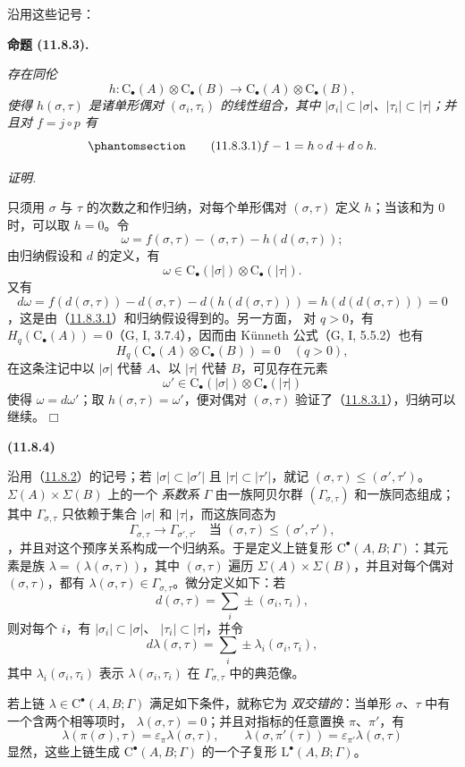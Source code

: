 \documentclass[UTF8,fontset=none,11pt,oneside,openany]{ctexbook}
\providecommand{\square}{\mdlgwhtsquare}
\newenvironment{env}[1][]{%
  \par\medskip\noindent\textbf{(#1)}\ %
}{\par}
\newenvironment{proposition}[1][]{%
  \par\medskip\noindent\textbf{命题 (#1).}\ %
}{\par}
\newenvironment{proof}{%
  \par\smallskip\noindent\textit{证明.}\ %
}{\hfill$\square$\par}
\newcommand{\oldpage}[2][]{%
  \hypertarget{ega-source-page-#1-#2}{}%
  \marginnote{\scriptsize\textbf{#1}~|~#2}\ignorespaces}
\let\EGAOriginalLabel\label
\renewcommand{\label}[1]{\phantomsection\EGAOriginalLabel{#1}}
\begin{document}
\oldpage[0\textsubscript{III}]{44}
沿用这些记号：
\begin{proposition}[11.8.3]
\label{0.11.8.3-fr}
\emph{存在同伦
\[
h:\mathrm C_\bullet(A)\otimes\mathrm C_\bullet(B)
\longrightarrow\mathrm C_\bullet(A)\otimes\mathrm C_\bullet(B),
\]
使得 $h(\sigma,\tau)$ 是诸单形偶对 $(\sigma_i,\tau_i)$ 的线性组合，其中
$|\sigma_i|\subset|\sigma|$、$|\tau_i|\subset|\tau|$；并且对
$f=j\circ p$ 有}
\[
\label{0.11.8.3.1-fr}
\tag{11.8.3.1}
f-1=h\circ d+d\circ h.
\]
\end{proposition}

\begin{proof}
只须用 $\sigma$ 与 $\tau$ 的次数之和作归纳，对每个单形偶对
$(\sigma,\tau)$ 定义 $h$；当该和为 $0$ 时，可以取 $h=0$。令
\[
\omega=f(\sigma,\tau)-(\sigma,\tau)-h(d(\sigma,\tau));
\]
由归纳假设和 $d$ 的定义，有
\[
\omega\in\mathrm C_\bullet(|\sigma|)\otimes\mathrm C_\bullet(|\tau|).
\]
又有
\[
d\omega=f(d(\sigma,\tau))-d(\sigma,\tau)-d(h(d(\sigma,\tau)))
=h(d(d(\sigma,\tau)))=0
\]
，这是由（\hyperref[0.11.8.3.1-fr]{11.8.3.1}）和归纳假设得到的。另一方面，
对 $q>0$，有 $H_q(\mathrm C_\bullet(A))=0$（G, I, 3.7.4），因而由 Künneth
公式（G, I, 5.5.2）也有
\[
H_q(\mathrm C_\bullet(A)\otimes\mathrm C_\bullet(B))=0\quad(q>0),
\]
在这条注记中以 $|\sigma|$ 代替 $A$、以 $|\tau|$ 代替 $B$，可见存在元素
\[
\omega'\in\mathrm C_\bullet(|\sigma|)\otimes\mathrm C_\bullet(|\tau|)
\]
使得 $\omega=d\omega'$；取 $h(\sigma,\tau)=\omega'$，便对偶对
$(\sigma,\tau)$ 验证了（\hyperref[0.11.8.3.1-fr]{11.8.3.1}），归纳可以继续。
\end{proof}

\begin{env}[11.8.4]
\label{0.11.8.4-fr}
沿用（\hyperref[0.11.8.2-fr]{11.8.2}）的记号；若
$|\sigma|\subset|\sigma'|$ 且 $|\tau|\subset|\tau'|$，就记
$(\sigma,\tau)\leq(\sigma',\tau')$。$\Sigma(A)\times\Sigma(B)$ 上的一个
\emph{系数系} $\Gamma$ 由一族阿贝尔群 $(\Gamma_{\sigma,\tau})$ 和一族同态组成；其中
$\Gamma_{\sigma,\tau}$ 只依赖于集合 $|\sigma|$ 和 $|\tau|$，而这族同态为
\[
\Gamma_{\sigma,\tau}\longrightarrow\Gamma_{\sigma',\tau'}
\quad\text{当 }(\sigma,\tau)\leq(\sigma',\tau'),
\]
，并且对这个预序关系构成一个归纳系。于是定义上链复形
$\mathrm C^\bullet(A,B;\Gamma)$：其元素是族
$\lambda=(\lambda(\sigma,\tau))$，其中 $(\sigma,\tau)$ 遍历
$\Sigma(A)\times\Sigma(B)$，并且对每个偶对 $(\sigma,\tau)$，都有
$\lambda(\sigma,\tau)\in\Gamma_{\sigma,\tau}$。微分定义如下：若
\[
d(\sigma,\tau)=\sum_i\pm(\sigma_i,\tau_i),
\]
则对每个 $i$，有 $|\sigma_i|\subset|\sigma|$、
$|\tau_i|\subset|\tau|$，并令
\[
d\lambda(\sigma,\tau)=\sum_i\pm\lambda_i(\sigma_i,\tau_i),
\]
其中 $\lambda_i(\sigma_i,\tau_i)$ 表示 $\lambda(\sigma_i,\tau_i)$ 在
$\Gamma_{\sigma,\tau}$ 中的典范像。

若上链 $\lambda\in\mathrm C^\bullet(A,B;\Gamma)$ 满足如下条件，就称它为
\emph{双交错的}：当单形 $\sigma$、$\tau$ 中有一个含两个相等项时，
$\lambda(\sigma,\tau)=0$；并且对指标的任意置换 $\pi$、$\pi'$，有
\[
\lambda(\pi(\sigma),\tau)=\varepsilon_\pi\lambda(\sigma,\tau),
\qquad
\lambda(\sigma,\pi'(\tau))=\varepsilon_{\pi'}\lambda(\sigma,\tau)
\]
显然，这些上链生成 $\mathrm C^\bullet(A,B;\Gamma)$ 的一个子复形
$\mathrm L^\bullet(A,B;\Gamma)$。
\end{env}
\end{document}
